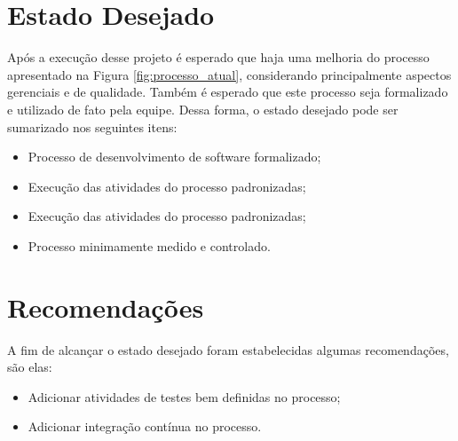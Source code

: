 \section{Estado Desejado}

Após a execução desse projeto é esperado que haja uma melhoria do processo apresentado na Figura \ref{fig:processo_atual}, 
considerando principalmente aspectos gerenciais e de qualidade. Também é esperado que este processo seja formalizado e utilizado
de fato pela equipe. Dessa forma, o estado desejado pode ser sumarizado nos seguintes itens:

\begin{itemize}
	\item Processo de desenvolvimento de software formalizado;
  \item Execução das atividades do processo padronizadas;
	\item Execução das atividades do processo padronizadas;
	\item Processo minimamente medido e controlado.

\end{itemize}

	
\section{Recomendações}

A fim de alcançar o estado desejado foram estabelecidas algumas recomendações, são elas: 

\begin{itemize}
    \item Adicionar atividades de testes bem definidas no processo;
    \item Adicionar integração contínua no processo.
\end{itemize}
